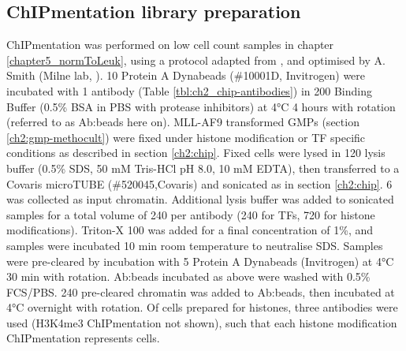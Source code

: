     \begin{table}[ht]
    \caption{Primers used for ChIP qPCR analysis.}
    \label{tbl:ch2_chip-primers}
    \end{table}

\subsection{\label{ch2:chipment}ChIPmentation library preparation}

ChIPmentation was performed on low cell count samples in chapter \ref{chapter5_normToLeuk}, using a protocol adapted from \cite{gustafsson_high-throughput_2019}, and optimised by A. Smith (Milne lab, \cite{crump_paf1_2022}). 10 \microl{} Protein A Dynabeads (\#10001D, Invitrogen) were incubated with 1 \microl{} antibody (Table \ref{tbl:ch2_chip-antibodies}) in 200 \microl{} Binding Buffer (0.5\% BSA in PBS with protease inhibitors) at 4°C 4 hours with rotation (referred to as Ab:beads here on).  MLL-AF9 transformed GMPs (section \ref{ch2:gmp-methocult}) were fixed under histone modification or TF specific conditions as described in section \ref{ch2:chip}. Fixed cells were lysed in 120 \microl{} lysis buffer (0.5\% SDS, 50 mM Tris-HCl pH 8.0, 10 mM EDTA), then transferred to a Covaris microTUBE (\#520045,Covaris) and sonicated as in section \ref{ch2:chip}. 6 \microl{} was collected as input chromatin. Additional lysis buffer was added to sonicated samples for a total volume of 240 \microl{} per antibody (240 \microl{} for TFs, 720 \microl{} for histone modifications). Triton-X 100 was added for a final concentration of 1\%, and samples were incubated 10 min room temperature to neutralise SDS. Samples were pre-cleared by incubation with 5 \microl{} Protein A Dynabeads (Invitrogen) at 4°C 30 min with rotation. Ab:beads incubated as above were washed with 0.5\% FCS/PBS. 240 \microl{} pre-cleared chromatin was added to Ab:beads, then incubated at 4°C overnight with rotation. Of  cells prepared for histones, three antibodies were used (H3K4me3 ChIPmentation not shown), such that each histone modification ChIPmentation represents  cells.
    

